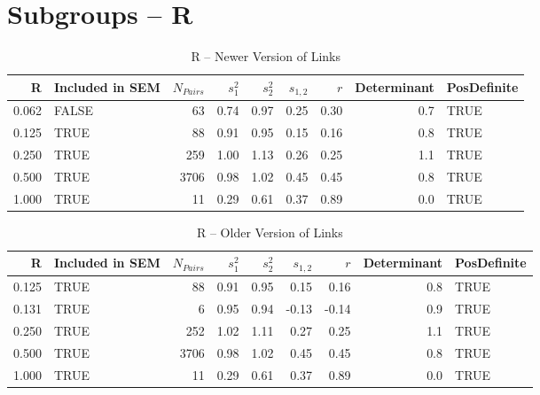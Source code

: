 \documentclass{article}\usepackage{graphicx, color}
\begin{document}
\section{Subgroups --  R }%
\begin{table}[ht]
\centering
\begin{tabular}{rlrrrrrrl}
  \hline
R & Included in SEM & $N_{Pairs}$ & $s_1^2$ & $s_2^2$ & $s_{1,2}$ & $r$ & Determinant & PosDefinite \\ 
  \hline
0.062 & FALSE & 63 & 0.74 & 0.97 & 0.25 & 0.30 & 0.7 & TRUE \\ 
  0.125 & TRUE & 88 & 0.91 & 0.95 & 0.15 & 0.16 & 0.8 & TRUE \\ 
  0.250 & TRUE & 259 & 1.00 & 1.13 & 0.26 & 0.25 & 1.1 & TRUE \\ 
  0.500 & TRUE & 3706 & 0.98 & 1.02 & 0.45 & 0.45 & 0.8 & TRUE \\ 
  1.000 & TRUE & 11 & 0.29 & 0.61 & 0.37 & 0.89 & 0.0 & TRUE \\ 
   \hline
\end{tabular}
\caption{R -- Newer Version of Links} 
\end{table}
\begin{table}[ht]
\centering
\begin{tabular}{rlrrrrrrl}
  \hline
R & Included in SEM & $N_{Pairs}$ & $s_1^2$ & $s_2^2$ & $s_{1,2}$ & $r$ & Determinant & PosDefinite \\ 
  \hline
0.125 & TRUE & 88 & 0.91 & 0.95 & 0.15 & 0.16 & 0.8 & TRUE \\ 
  0.131 & TRUE & 6 & 0.95 & 0.94 & -0.13 & -0.14 & 0.9 & TRUE \\ 
  0.250 & TRUE & 252 & 1.02 & 1.11 & 0.27 & 0.25 & 1.1 & TRUE \\ 
  0.500 & TRUE & 3706 & 0.98 & 1.02 & 0.45 & 0.45 & 0.8 & TRUE \\ 
  1.000 & TRUE & 11 & 0.29 & 0.61 & 0.37 & 0.89 & 0.0 & TRUE \\ 
   \hline
\end{tabular}
\caption{R -- Older Version of Links} 
\end{table}
\newpage 
\end{document}

